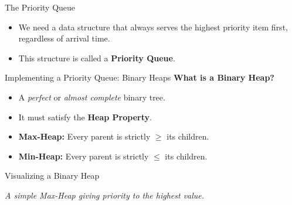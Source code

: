 \documentclass[11pt, aspectratio=169]{beamer}
\begin{document}
\begin{frame}{The Priority Queue}
    \begin{center}
    \end{center}
    \vspace{0.5cm}
    \begin{itemize}
        \item We need a data structure that always serves the highest priority item first, regardless of arrival time.
        \item This structure is called a \textbf{Priority Queue}.
    \end{itemize}
\end{frame}

\begin{frame}{Implementing a Priority Queue: Binary Heaps}
    \textbf{What is a Binary Heap?}
    \begin{itemize}
        \item A \textit{perfect} or \textit{almost complete} binary tree.
        \item It must satisfy the \textbf{Heap Property}.
        \item \textbf{Max-Heap:} Every parent is strictly $\ge$ its children.
        \item \textbf{Min-Heap:} Every parent is strictly $\le$ its children.
    \end{itemize}
\end{frame}

\begin{frame}{Visualizing a Binary Heap}
    \begin{center}
        
        \vspace{0.3cm}
        \small{\textit{A simple Max-Heap giving priority to the highest value.}}
    \end{center}
\end{frame}
\end{document}
